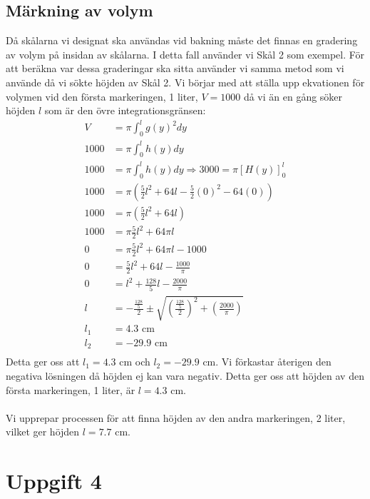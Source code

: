 \documentclass[12pt]{article}
\begin{document}
\subsection*{Märkning av volym}
Då skålarna vi designat ska användas vid bakning måste det finnas en gradering av volym på insidan av skålarna. I detta fall använder vi Skål 2 som exempel. För att beräkna var dessa graderingar ska sitta använder vi samma metod som vi använde då vi sökte höjden av Skål 2. Vi börjar med att ställa upp ekvationen för volymen vid den första markeringen, 1 liter, $V=1000$ då vi än en gång söker höjden $l$ som är den övre integrationsgränsen:
\begin{align*}
    V&=\pi\int_{0}^{l}{g(y)}^2dy\\
    1000&=\pi\int_{0}^{l}{h(y)}dy\\
    1000&=\pi\int_{0}^{l}{h(y)}dy\Rightarrow 3000=\pi{\left[{H(y)}\right]}_{0}^{l}\\
    1000&=\pi\left(\frac{5}{2}{l}^2+64l-\frac{5}{2}{(0)}^2-64(0)\right)\\
    1000&=\pi\left(\frac{5}{2}{l}^2+64l\right)\\
    1000&=\pi\frac{5}{2}l^2+64\pi l\\
    0&=\pi\frac{5}{2}l^2+64\pi l-1000\\
    0&=\frac{5}{2}l^2+64l-\frac{1000}{\pi}\\
    0&=l^2+\frac{128}{5}l-\frac{2000}{\pi}\\
    l&=-\frac{\frac{128}{5}}{2}\pm\sqrt{{\left(\frac{\frac{128}{5}}{2}\right)}^2+\left(\frac{2000}{\pi}\right)}\\
    l_1&=4.3\text{ cm}\\
    l_2&=-29.9\text{ cm}\\
\end{align*}
\newpage
Detta ger oss att $l_1=4.3\text{ cm}$ och $l_2=-29.9\text{ cm}$. Vi förkastar återigen den negativa lösningen då höjden ej kan vara negativ. Detta ger oss att höjden av den första markeringen, 1 liter, är $l=4.3\text{ cm}$.
\\\\
Vi upprepar processen för att finna höjden av den andra markeringen, 2 liter, vilket ger höjden $l=7.7\text{ cm}$.\\
\section*{Uppgift 4}
\end{document}
